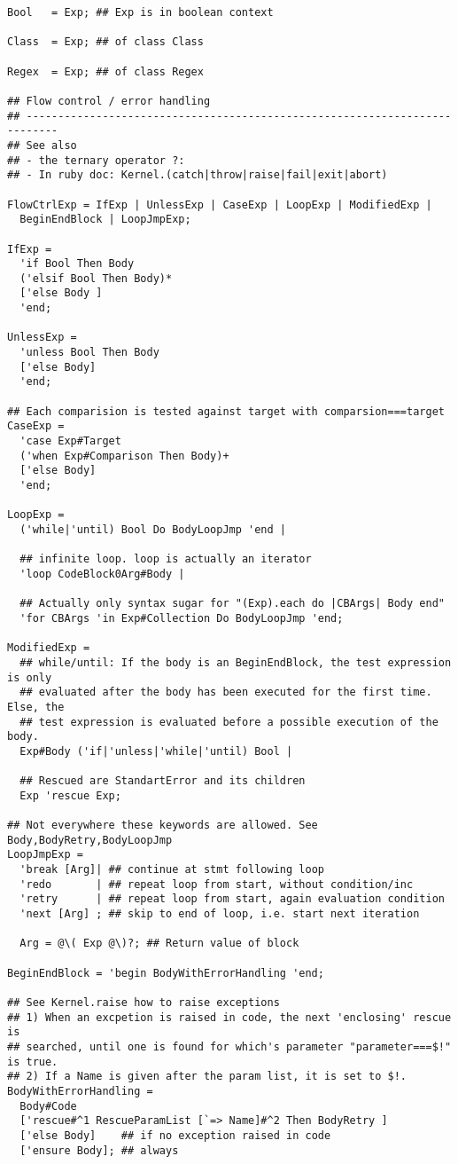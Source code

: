\documentclass{article}
\begin{document}
\begin{verbatim}
Bool   = Exp; ## Exp is in boolean context       
       
Class  = Exp; ## of class Class
       
Regex  = Exp; ## of class Regex
       
## Flow control / error handling
## ---------------------------------------------------------------------------
## See also
## - the ternary operator ?:   
## - In ruby doc: Kernel.(catch|throw|raise|fail|exit|abort)
        
FlowCtrlExp = IfExp | UnlessExp | CaseExp | LoopExp | ModifiedExp |
  BeginEndBlock | LoopJmpExp;   

IfExp =
  'if Bool Then Body 
  ('elsif Bool Then Body)*
  ['else Body ]
  'end;
  
UnlessExp =  
  'unless Bool Then Body
  ['else Body]
  'end;

## Each comparision is tested against target with comparsion===target
CaseExp =
  'case Exp#Target
  ('when Exp#Comparison Then Body)+
  ['else Body]
  'end;

LoopExp =
  ('while|'until) Bool Do BodyLoopJmp 'end |
  
  ## infinite loop. loop is actually an iterator
  'loop CodeBlock0Arg#Body |
  
  ## Actually only syntax sugar for "(Exp).each do |CBArgs| Body end"
  'for CBArgs 'in Exp#Collection Do BodyLoopJmp 'end;
  
ModifiedExp =
  ## while/until: If the body is an BeginEndBlock, the test expression is only
  ## evaluated after the body has been executed for the first time. Else, the
  ## test expression is evaluated before a possible execution of the body.
  Exp#Body ('if|'unless|'while|'until) Bool |
  
  ## Rescued are StandartError and its children
  Exp 'rescue Exp;
            
## Not everywhere these keywords are allowed. See Body,BodyRetry,BodyLoopJmp
LoopJmpExp =
  'break [Arg]| ## continue at stmt following loop
  'redo       | ## repeat loop from start, without condition/inc
  'retry      | ## repeat loop from start, again evaluation condition
  'next [Arg] ; ## skip to end of loop, i.e. start next iteration
  
  Arg = @\( Exp @\)?; ## Return value of block
            
BeginEndBlock = 'begin BodyWithErrorHandling 'end;
        
## See Kernel.raise how to raise exceptions
## 1) When an excpetion is raised in code, the next 'enclosing' rescue is
## searched, until one is found for which's parameter "parameter===$!" is true.
## 2) If a Name is given after the param list, it is set to $!.
BodyWithErrorHandling =
  Body#Code
  ['rescue#^1 RescueParamList [`=> Name]#^2 Then BodyRetry ]
  ['else Body]    ## if no exception raised in code
  ['ensure Body]; ## always
            

\end{verbatim}
\end{document}
